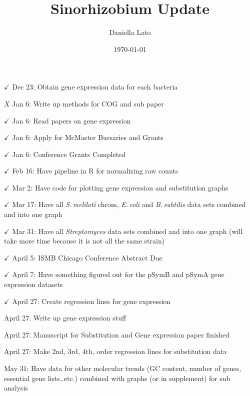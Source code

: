 \documentclass[12pt]{article}
\title{Sinorhizobium Update}
\author{Daniella Lato}
\date{\today}
\newcommand{\smel}{\textit{S.\,meliloti}\xspace}
\newcommand{\strep}{\textit{Streptomyces}\xspace}
\newcommand{\bass}{\textit{B.\,subtilis}\xspace}
\newcommand{\ecol}{\textit{E.\,coli}\xspace}
\newcommand{\pa}{pSymA\xspace}
\newcommand{\pb}{pSymB\xspace}
\begin{document}
$\checkmark$	Dec 23:	Obtain gene expression data for each bacteria
	

	
	
	
	
	
	
$X$	Jan 6: Write up methods for COG and sub paper

$\checkmark$	Jan 6: Read papers on gene expression
	
$\checkmark$	Jan 6: Apply for McMaster Bursaries and Grants
	
$\checkmark$	Jan 6:	Conference Grants Completed	

$\checkmark$	Feb 16: Have pipeline in R for normalizing raw counts
	
$\checkmark$	Mar 2: Have code for plotting gene expression and substitution graphs
	
$\checkmark$	Mar 17: Have all \smel chrom, \ecol and \bass data sets combined and into one graph
	
$\checkmark$	Mar 31: Have all \strep data sets combined and into one graph (will take more time because it is not all the same strain)
	
$\checkmark$	April 5: ISMB Chicago Conference Abstract Due
	
$\checkmark$	April 7: Have something figured out for the \pb and \pa gene expression datasets

$\checkmark$	April 27: Create regression lines for gene expression
	
	April 27: Write up gene expression stuff
	
	April 27: Manuscript for Substitution and Gene expression paper finished
	
	April 27: Make 2nd, 3rd, 4th, order regression lines for substitution data
	
	May 31:	Have data for other molecular trends (GC content, number of genes, essential gene lists..etc.) combined with graphs (or in supplement) for sub analysis
	
\end{document}
